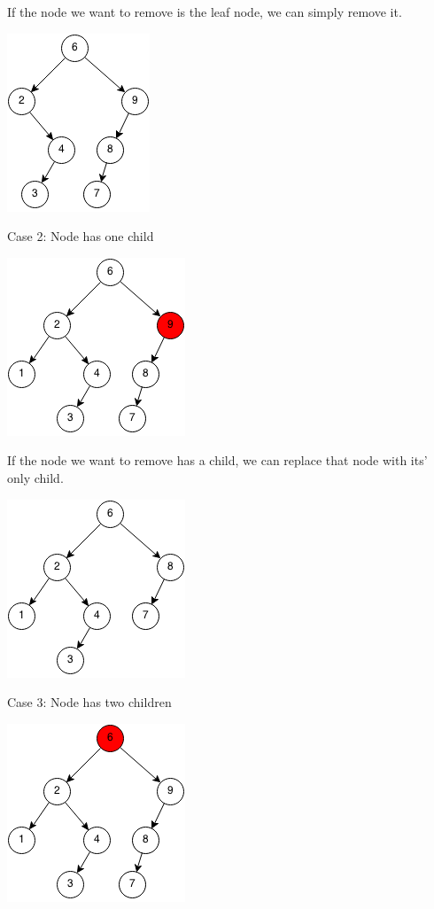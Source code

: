 \documentclass[11pt,oneside]{book}
\makeatletter
\def\maxwidth#1{\ifdim\Gin@nat@width>#1 #1\else\Gin@nat@width\fi}
\makeatother
\begin{document}
If the node we want to remove is the leaf node, we can simply remove it.

\vspace{5px}\includegraphics[width=\maxwidth{\textwidth}]{bst-rem-case12.png}

Case 2: Node has one child

\vspace{5px}\includegraphics[width=\maxwidth{\textwidth}]{bst-rem-case21.png}

If the node we want to remove has a child, we can replace that node with its' only child.

\vspace{5px}\includegraphics[width=\maxwidth{\textwidth}]{bst-rem-case22.png}

Case 3: Node has two children

\vspace{5px}\includegraphics[width=\maxwidth{\textwidth}]{bst-rem-case31.png}
\end{document}
